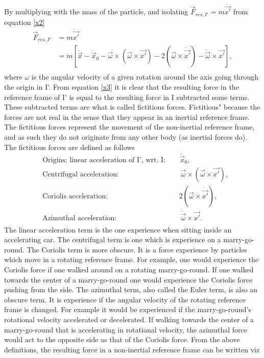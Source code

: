 By multiplying with the mass of the particle, and isolating $\vec{F}_{res,I'}=m\ddot{\vec{x'}}$ from equation \eqref{x2}
\begin{equation}
	\begin{split}
		\vec{F}_{res,I'}&=m\ddot{\vec{x'}}\\
		&=m[\ddot{\vec{x}}-\ddot{\vec{x}}_0-\vec{\omega}\times (\vec{\omega}\times \vec{x'})-2(\vec{\omega}\times \dot{\vec{x'}})-\dot{\vec{\omega}}\times \vec{x'}],\\
	\end{split}
	\label{x3}
\end{equation} 
where $\omega$ is the angular velocity of a given rotation around the axis going through the origin in I'. From equation \eqref{x3} it is clear that the resulting force in the reference frame of I' is equal to the resulting force in I subtracted some terms. These subtracted terms are what is called fictitious forces. Fictitious" because the forces are not real in the sense that they appear in an inertial reference frame. The fictitious forces represent the movement of the non-inertial reference frame, and as such they do not originate from any other body (as inertial forces do). The fictitious forces are defined as follows
\begin{equation}
	\begin{split}
		&\text{Origins; linear acceleration of I', wrt. I:}\qquad \ddot{\vec{x}}_0,\\
		&\text{Centrifugal acceleration:}\quad\qquad\quad\qquad\qquad\,\,\,\, \vec{\omega}\times (\vec{\omega}\times \vec{x'}),\\
		&\text{Coriolis acceleration: }\qquad\quad\quad\qquad\quad\qquad\,\,\,\, 2(\vec{\omega}\times \dot{\vec{x'}}),\\
		&\text{Azimuthal acceleration: }\qquad\quad\quad\qquad\qquad\,\,\,\, \dot{\vec{\omega}}\times \vec{x'}.\\
	\end{split}
\end{equation} 
The linear acceleration term is the one experience when sitting inside an accelerating car. The centrifugal term is one which is experience on a marry-go-round. The Coriolis term is more obscure. It is a force experience by particles which move in a rotating reference frame. For example, one would experience the Coriolis force if one walked around on a rotating marry-go-round. If one walked towards the center of a marry-go-round one would experience the Coriolis force pushing from the side. The azimuthal term, also called the Euler term, is also an obscure term. It is experience if the angular velocity of the rotating reference frame is changed. For example it would be experienced if the marry-go-round's rotational velocity accelerated or decelerated. If walking towards the center of a marry-go-round that is accelerating in rotational velocity, the azimuthal force would act to the opposite side as that of the Coriolis force. From the above definitions, the resulting force in a non-inertial reference frame can be written viz
